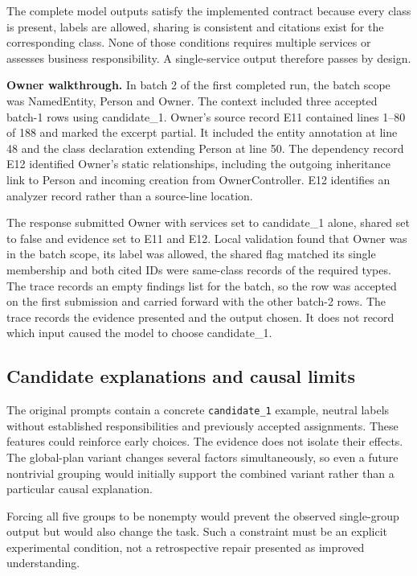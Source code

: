 The complete model outputs satisfy the implemented contract because every class is present, labels are allowed, sharing is consistent and citations exist for the corresponding class. None of those conditions requires multiple services or assesses business responsibility. A single-service output therefore passes by design.

\textbf{Owner walkthrough.} In batch 2 of the first completed run, the batch scope was NamedEntity, Person and Owner. The context included three accepted batch-1 rows using candidate\_1. Owner's source record E11 contained lines 1--80 of 188 and marked the excerpt partial. It included the entity annotation at line 48 and the class declaration extending Person at line 50. The dependency record E12 identified Owner's static relationships, including the outgoing inheritance link to Person and incoming creation from OwnerController. E12 identifies an analyzer record rather than a source-line location.

The response submitted Owner with services set to candidate\_1 alone, shared set to false and evidence set to E11 and E12. Local validation found that Owner was in the batch scope, its label was allowed, the shared flag matched its single membership and both cited IDs were same-class records of the required types. The trace records an empty findings list for the batch, so the row was accepted on the first submission and carried forward with the other batch-2 rows. The trace records the evidence presented and the output chosen. It does not record which input caused the model to choose candidate\_1.

\subsection{Candidate explanations and causal limits}

The original prompts contain a concrete \texttt{candidate\_\allowbreak{}1} example, neutral labels without established responsibilities and previously accepted assignments. These features could reinforce early choices. The evidence does not isolate their effects. The global-plan variant changes several factors simultaneously, so even a future nontrivial grouping would initially support the combined variant rather than a particular causal explanation.

Forcing all five groups to be nonempty would prevent the observed single-group output but would also change the task. Such a constraint must be an explicit experimental condition, not a retrospective repair presented as improved understanding.

